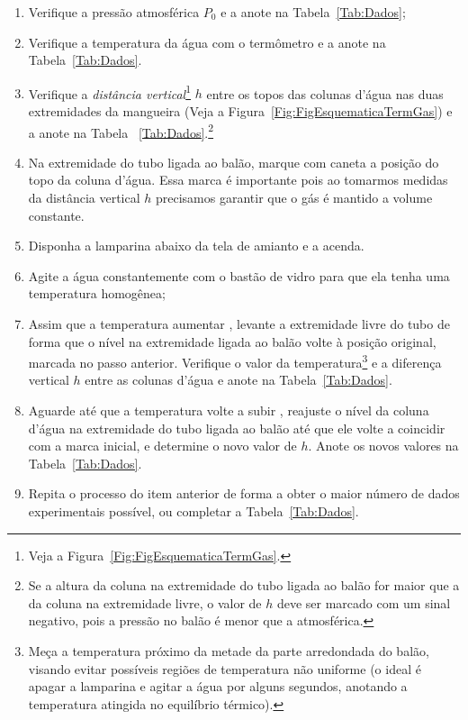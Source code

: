 \begin{enumerate}
\item Verifique a pressão atmosférica $P_0$ e a anote na Tabela~\ref{Tab:Dados};
\item Verifique a temperatura da água com o termômetro e a anote na Tabela~\ref{Tab:Dados}.
\item Verifique a \emph{distância vertical}\footnote{Veja a Figura~\ref{Fig:FigEsquematicaTermGas}.} $h$ entre os topos das colunas d'água nas duas extremidades da mangueira (Veja a Figura~\ref{Fig:FigEsquematicaTermGas}) e a anote na Tabela~
\ref{Tab:Dados}.\footnote{Se a altura da coluna na extremidade do tubo ligada ao balão for maior que a da coluna na extremidade livre, o valor de $h$ deve ser marcado com um sinal negativo, pois a pressão no balão é menor que a atmosférica.}
\item Na extremidade do tubo ligada ao balão, marque com caneta a posição do topo da coluna d'água. Essa marca é importante pois ao tomarmos medidas da distância vertical $h$ precisamos garantir que o gás é mantido a volume constante.
\item Disponha a lamparina abaixo da tela de amianto e a acenda.
\item Agite a água constantemente com o bastão de vidro para que ela tenha uma temperatura homogênea; 
\item Assim que a temperatura aumentar , levante a extremidade livre do tubo de forma que o nível na extremidade ligada ao balão volte à posição original, marcada no passo anterior. Verifique o valor da temperatura\footnote{Meça a temperatura próximo da metade da parte arredondada do balão, visando evitar possíveis regiões de temperatura não uniforme (o ideal é apagar a lamparina e agitar a água por alguns segundos, anotando a temperatura atingida no equilíbrio térmico).} e a diferença vertical $h$ entre as colunas d'água e anote na Tabela~\ref{Tab:Dados}.
\item Aguarde até que a temperatura volte a subir , reajuste o nível da coluna d'água na extremidade do tubo ligada ao balão até que ele volte a coincidir com a marca inicial, e determine o novo valor de $h$. Anote os novos valores na Tabela~\ref{Tab:Dados}.
\item Repita o processo do item anterior de forma a obter o maior número de dados experimentais possível, ou completar a Tabela~\ref{Tab:Dados}.
\end{enumerate}

\cleardoublepage

